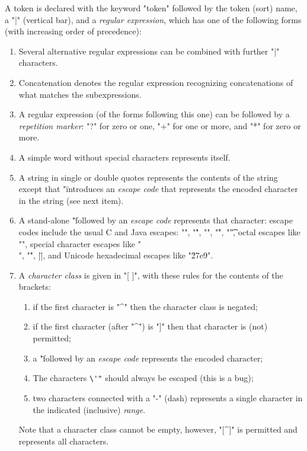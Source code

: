 \documentclass[11pt]{article} %
\begin{document}
\begin{manual}\label{man:token}
  A token is declared with the keyword "token" followed by the token (sort) name, a "|" (vertical
  bar), and a \emph{regular expression}, which has one of the following forms (with increasing order
  of precedence):
  \begin{enumerate}

  \item Several alternative regular expressions can be combined with further "|" characters.

  \item Concatenation denotes the regular expression recognizing concatenations of what matches the
    subexpressions.

  \item A regular expression (of the forms following this one) can be followed by a \emph{repetition
      marker}: "?" for zero or one, "+" for one or more, and "*" for zero or more.

  \item A simple word without special characters represents itself.

  \item A string in single or double quotes represents the contents of the string except that "\"
    introduces an \emph{escape code} that represents the encoded character in the string (see next item).

  \item A stand-alone "\" followed by an \emph{escape code} represents that character: escape codes
    include the usual C and Java escapes: "\n", "\r", "\a", "\f", "\t", octal escapes like "",
    special character escapes like "\\", "\'", \hacsc|\"|, and Unicode hexadecimal escapes like
    "\u27e9".

  \item A \emph{character class} is given in "[ ]", with these rules for the contents of the brackets:
   \begin{enumerate}
    \item if the first character is "^" then the character class is negated;
    \item if the first character (after "^") is "]" then that character is (not) permitted;
    \item a "\" followed by an \emph{escape code} represents the encoded character;
    \item The characters \verb|\'"| should always be escaped (this is a bug);
    \item two characters connected with a "-" (dash) represents a single character in the indicated
      (inclusive) \emph{range}.
    \end{enumerate}
    Note that a character class cannot be empty, however, "[^]" is permitted and represents all
    characters.


\end{enumerate}
\end{manual}
\end{document}
